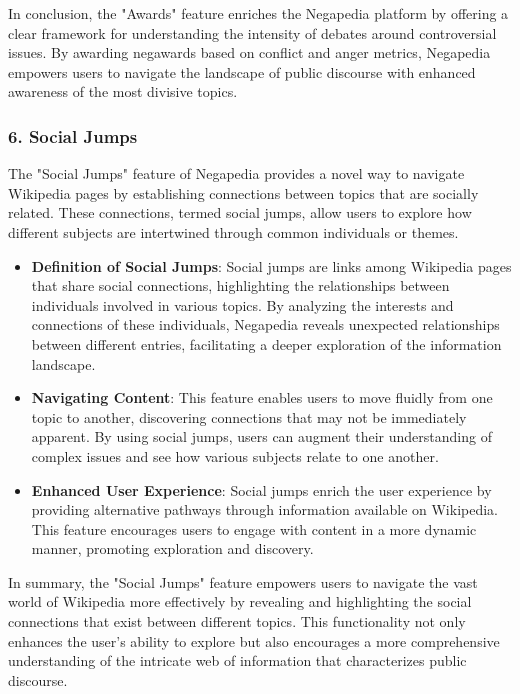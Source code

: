 In conclusion, the "Awards" feature enriches the Negapedia platform by offering a clear framework for understanding the intensity of debates around controversial issues. By awarding negawards based on conflict and anger metrics, Negapedia empowers users to navigate the landscape of public discourse with enhanced awareness of the most divisive topics.

\subsubsection{6. Social Jumps}

The "Social Jumps" feature of Negapedia provides a novel way to navigate Wikipedia pages by establishing connections between topics that are socially related. These connections, termed social jumps, allow users to explore how different subjects are intertwined through common individuals or themes.

\begin{itemize}
    \item \textbf{Definition of Social Jumps}: Social jumps are links among Wikipedia pages that share social connections, highlighting the relationships between individuals involved in various topics. By analyzing the interests and connections of these individuals, Negapedia reveals unexpected relationships between different entries, facilitating a deeper exploration of the information landscape.
    
    \item \textbf{Navigating Content}: This feature enables users to move fluidly from one topic to another, discovering connections that may not be immediately apparent. By using social jumps, users can augment their understanding of complex issues and see how various subjects relate to one another.
    
    \item \textbf{Enhanced User Experience}: Social jumps enrich the user experience by providing alternative pathways through information available on Wikipedia. This feature encourages users to engage with content in a more dynamic manner, promoting exploration and discovery.
\end{itemize}

In summary, the "Social Jumps" feature empowers users to navigate the vast world of Wikipedia more effectively by revealing and highlighting the social connections that exist between different topics. This functionality not only enhances the user's ability to explore but also encourages a more comprehensive understanding of the intricate web of information that characterizes public discourse.

